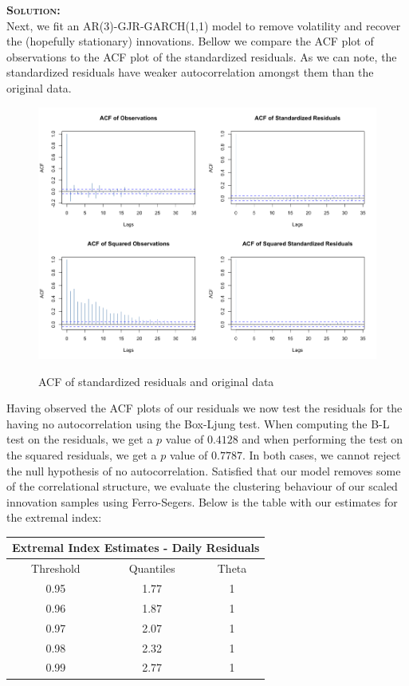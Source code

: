 \documentclass[12pt,oneside]{article}
\newenvironment{solution}
    {\textbf{\textsc{Solution:}}\\}
    {\newpage}
\begin{document}
\begin{solution}
Next, we fit an AR(3)-GJR-GARCH(1,1) model to remove volatility and recover the (hopefully stationary) innovations. Bellow we compare the ACF plot of observations to the ACF plot of the standardized residuals. As we can note, the standardized residuals have weaker autocorrelation amongst them than the original data. 
\begin{figure}[H]
\begin{center}
{\includegraphics[width=4.5in]{Assignments/a4/day-acfs.png}}
\caption{ACF of standardized residuals and original data}
\end{center}
\end{figure}

Having observed the ACF plots of our residuals we now test the residuals for the having no autocorrelation using the Box-Ljung test. When computing the B-L test on the residuals, we get a $p$ value of $0.4128$ and when performing the test on the squared residuals, we get a $p$ value of $0.7787$. In both cases, we cannot reject the null hypothesis of no autocorrelation. Satisfied that our model removes some of the correlational structure, we evaluate the clustering behaviour of our scaled innovation samples  using Ferro-Segers. Below is the table with our estimates for the extremal index:
\begin{center}
\begin{tabular}{ ||c |c |c|| }\hline
\multicolumn{3}{||c||}{Extremal Index Estimates - Daily Residuals}\\\hline\hline
Threshold & Quantiles& Theta\\\hline
 0.95 & 1.77 & 1 \\ \hline
 0.96 & 1.87 & 1 \\  \hline
 0.97 & 2.07 & 1  \\\hline  
 0.98 & 2.32 & 1 \\ \hline
 0.99 & 2.77 & 1 \\  \hline
\end{tabular}
\end{center}



\end{solution}
\end{document}
